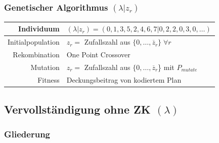 \begin{frame}
	\frametitle{Genetischer Algorithmus $(\lambda|z_{r})$}
	\begin{small}
		\begin{center}
			\begin{tabular}{rl}
				\hline 
				Individuum & $(\lambda|z_{r})=(0,1,3,5,2,4,6,7|0,2,2,0,3,0,\ldots)$\parbox[c][40pt][c]{0pt}{}\tabularnewline
				\hline 
				Initialpopulation & $z_{r}=$ Zufallszahl aus $\{0, \ldots, \overline{z}_{r}\} \; \forall r$\tabularnewline
				\hline 
				Rekombination & One Point Crossover\tabularnewline
				\hline 
				Mutation & $z_{r}=$ Zufallszahl aus $\{0, \ldots, \overline{z}_{r}$\} mit $P_{mutate}$\tabularnewline
				\hline 
				Fitness & Deckungsbeitrag von kodiertem Plan\tabularnewline
				\hline
			\end{tabular}
		\end{center}
	\end{small}
\end{frame}


\subsection{Vervollständigung ohne ZK $(\lambda)$}
\begin{frame}[noframenumbering]
	\frametitle{Gliederung}
	\tableofcontents[currentsubsection]
\end{frame}

